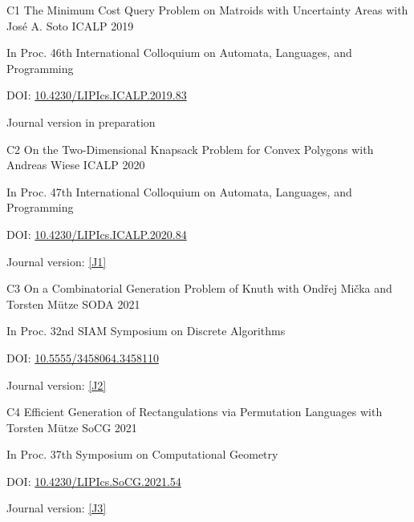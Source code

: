 \begin{cvpublication}
	{C1}
	{The Minimum Cost Query Problem on Matroids with Uncertainty Areas}
	{with José A. Soto}
	{ICALP}
	{2019}
    {
	\begin{cvitems}
	\item In Proc. 46th International Colloquium on Automata, Languages, and Programming
	\item[] DOI: \href{https://doi.org/10.4230/LIPIcs.ICALP.2019.83}{10.4230/LIPIcs.ICALP.2019.83}
	\item Journal version in preparation
	\end{cvitems}
	}
\end{cvpublication}
\begin{cvpublication}
	{C2}
	{On the Two-Dimensional Knapsack Problem for Convex Polygons}
	{with Andreas Wiese}
	{ICALP}
	{2020}
    {
	\begin{cvitems}
	\item In Proc. 47th International Colloquium on Automata, Languages, and Programming
	\item[] DOI: \href{https://doi.org/10.4230/LIPIcs.ICALP.2020.84}{10.4230/LIPIcs.ICALP.2020.84}
	\item Journal version: \hyperlink{paperC1}{[J1]}
	\end{cvitems}
	}
\end{cvpublication}
\begin{cvpublication}
	{C3}
	{On a Combinatorial Generation Problem of Knuth}
	{with Ondřej Mička and Torsten Mütze}
	{SODA}
	{2021}
    {
	\begin{cvitems}
	\item In Proc. 32nd SIAM Symposium on Discrete Algorithms
	\item[] DOI: \href{https://doi.org/10.5555/3458064.3458110}{10.5555/3458064.3458110}
	\item Journal version: \hyperlink{paperC2}{[J2]}
	\end{cvitems}
	}
\end{cvpublication}
\begin{cvpublication}
	{C4}
	{Efficient Generation of Rectangulations via Permutation Languages}
	{with Torsten Mütze}
	{SoCG}
	{2021}
    {
	\begin{cvitems}
	\item In Proc. 37th Symposium on Computational Geometry
	\item[] DOI: \href{https://doi.org/10.4230/LIPIcs.SoCG.2021.54}{10.4230/LIPIcs.SoCG.2021.54}
	\item Journal version: \hyperlink{paperC3}{[J3]}
	\end{cvitems}
	}
\end{cvpublication}
